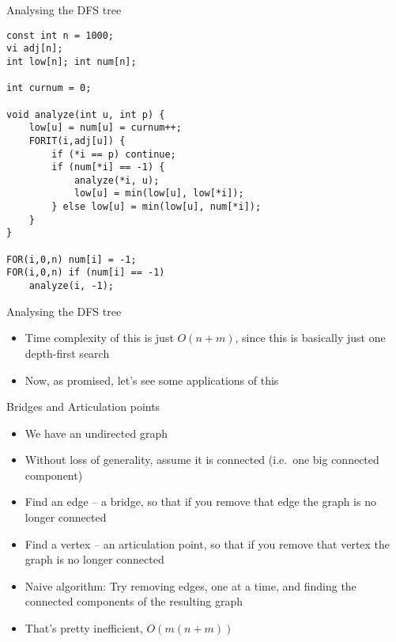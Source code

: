 \documentclass[12pt,t]{beamer}
\newcommand{\bi}{\begin{itemize}}
\newcommand{\ei}{\end{itemize}}
\begin{document}
\begin{frame}[fragile]{Analysing the DFS tree}
    \begin{verbatim}
const int n = 1000;
vi adj[n];
int low[n]; int num[n];

int curnum = 0;

void analyze(int u, int p) {
    low[u] = num[u] = curnum++;
    FORIT(i,adj[u]) {
        if (*i == p) continue;
        if (num[*i] == -1) {
            analyze(*i, u);
            low[u] = min(low[u], low[*i]);
        } else low[u] = min(low[u], num[*i]);
    }
}

FOR(i,0,n) num[i] = -1;
FOR(i,0,n) if (num[i] == -1)
    analyze(i, -1);
    \end{verbatim}
\end{frame}

\begin{frame}{Analysing the DFS tree}
    \vspace{30pt}
    \bi
        \item Time complexity of this is just $O(n + m)$, since this is basically just one depth-first search
        \vspace{20pt}
        \item Now, as promised, let's see some applications of this
    \ei
\end{frame}

\begin{frame}{Bridges and Articulation points}
    \vspace{20pt}
    \bi
        \item We have an undirected graph
        \item Without loss of generality, assume it is connected (i.e.\ one big connected component)
        \item Find an edge -- a bridge, so that if you remove that edge the graph is no longer connected
        \item Find a vertex -- an articulation point, so that if you remove that vertex the graph is no longer connected
        \pause
        \vspace{10pt}
        \item Naive algorithm: Try removing edges, one at a time, and finding the connected components of the resulting graph \pause
        \item That's pretty inefficient, $O(m(n + m))$
    \ei
\end{frame}
\end{document}

